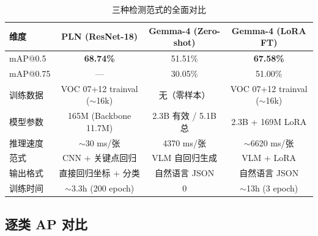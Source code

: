 \documentclass[12pt, a4paper]{article}
\begin{document}
\begin{table}[H]
\centering
\caption{三种检测范式的全面对比}
\label{tab:paradigm_compare}
\begin{tabular}{@{}lccc@{}}
\toprule
\textbf{维度} & \textbf{PLN (ResNet-18)} & \textbf{Gemma-4 (Zero-shot)} & \textbf{Gemma-4 (LoRA FT)} \\
\midrule
mAP@0.5 & \textbf{68.74\%} & 51.51\% & \textbf{67.58\%} \\
mAP@0.75 & --- & 30.05\% & 51.00\% \\
训练数据 & VOC 07+12 trainval ($\sim$16k) & 无（零样本） & VOC 07+12 trainval ($\sim$16k) \\
模型参数 & 165M (Backbone 11.7M) & 2.3B 有效 / 5.1B 总 & 2.3B + 169M LoRA \\
推理速度 & $\sim$30 ms/张 & 4370 ms/张 & $\sim$6620 ms/张 \\
范式 & CNN + 关键点回归 & VLM 自回归生成 & VLM + LoRA \\
输出格式 & 直接回归坐标 + 分类 & 自然语言 JSON & 自然语言 JSON \\
训练时间 & $\sim$3.3h (200 epoch) & 0 & $\sim$13h (3 epoch) \\
\bottomrule
\end{tabular}
\end{table}

\subsection{逐类 AP 对比}
\end{document}
